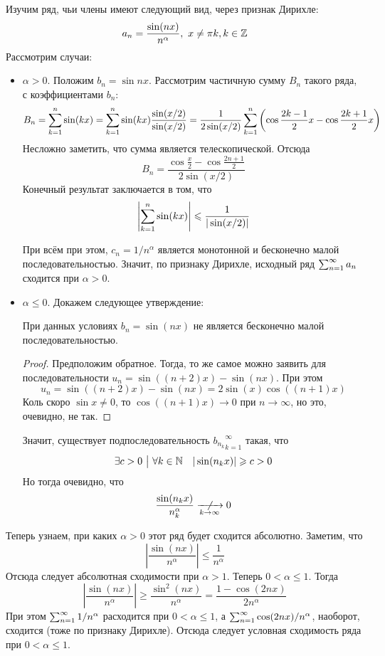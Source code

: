 \begin{example}
	Изучим ряд, чьи члены имеют следующий вид, через признак Дирихле:
	\[
		a_n = \frac{\sin (nx)}{n^\alpha},\ x \neq \pi k, k \in \mathbb{Z}
	\]
	Рассмотрим случаи:
	\begin{itemize}
		\item $\alpha > 0$. Положим $b_n = \sin nx$. Рассмотрим частичную сумму $B_n$ такого ряда, с коэффициентами $b_n$:
		\[
			B_n = \sum\limits_{k = 1}^n \sin (kx) = \sum\limits_{k = 1}^n \sin (kx) \frac{\sin (x / 2)}{\sin (x / 2)} = \frac{1}{2\sin (x / 2)} \sum\limits_{k = 1}^n \left(\cos \frac{2k - 1}{2}x - \cos \frac{2k + 1}{2}x\right)
		\]
		Несложно заметить, что сумма является телескопической. Отсюда
		\[
			B_n = \frac{\cos \frac{x}{2} - \cos \frac{2n + 1}{2}}{2 \sin (x / 2)}
		\]
		Конечный результат заключается в том, что
		\[
			\left|\sum\limits_{k = 1}^n \sin (kx)\right| \leqslant \frac{1}{|\sin (x / 2)|}
		\]
		
		При всём при этом, $c_n = 1 / n^\alpha$ является монотонной и бесконечно малой последовательностью. Значит, по признаку Дирихле, исходный ряд $\sum_{n = 1}^\infty a_n$ сходится при $\alpha > 0$.
		
		\item $\alpha \le 0$. Докажем следующее утверждение:
		\begin{lemma}
			При данных условиях $b_n = \sin (nx)$ не является бесконечно малой последовательностью.
		\end{lemma}
	
		\begin{proof}
			Предположим обратное. Тогда, то же самое можно заявить для последовательности $u_n = \sin ((n + 2)x) - \sin (nx)$. При этом
			\[
				u_n = \sin ((n + 2)x) - \sin (nx) = 2 \sin (x) \cos ((n + 1)x)
			\]
			Коль скоро $\sin x \neq 0$, то $\cos ((n + 1)x) \to 0$ при $n \to \infty$, но это, очевидно, не так.
		\end{proof}
	
		Значит, существует подпоследовательность ${b_{n_k}}_{k = 1}^\infty$ такая, что
		\[
			\exists c > 0 \ \big|\  \forall k \in \mathbb{N} \quad |\sin (n_k x)| \geqslant c > 0
		\]
		Но тогда очевидно, что
		\[
			\frac{\sin (n_k x)}{n_k^\alpha} \centernot{\xrightarrow[k \to \infty]{}} 0
		\]
	\end{itemize}

	Теперь узнаем, при каких $\alpha > 0$ этот ряд будет сходится абсолютно. Заметим, что
	\[
		\left|\frac{\sin (nx)}{n^\alpha}\right| \le \frac{1}{n^\alpha}
	\]
	Отсюда следует абсолютная сходимости при $\alpha > 1$. Теперь $0 < \alpha \le 1$. Тогда
	\[
		\left|\frac{\sin (nx)}{n^\alpha}\right| \ge \frac{\sin^2 (nx)}{n^\alpha} = \frac{1 - \cos (2nx)}{2n^\alpha}
	\]
	При этом $\sum_{n = 1}^\infty 1 / n^\alpha$ расходится при $0 < \alpha \le 1$, а $\sum_{n = 1}^\infty \cos(2nx) / n^\alpha$, наоборот, сходится (тоже по признаку Дирихле). Отсюда следует условная сходимость ряда при $0 < \alpha \le 1$.
\end{example}

